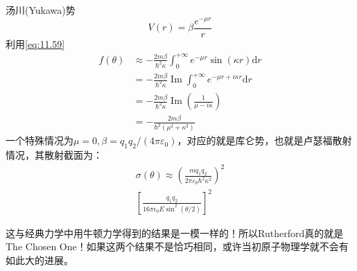\documentclass[a4paper,zihao=-4,linespread=1]{ctexrep}
\begin{document}
	\begin{example}{汤川(Yukawa)势}
		\begin{equation}
			V(r)=\beta\frac{e^{-\mu r}}{r}
		\end{equation}
	利用\ref{eq:11.59}
	\begin{equation}
		\begin{aligned}
		f(\theta)&\approx -\frac{2m\beta}{\hbar^2\kappa}\int_0^{+\infty}e^{-\mu r}\sin(\kappa r)\mathrm{d}r\\
		&=-\frac{2m\beta}{\hbar^2\kappa}\operatorname{Im}\int_0^{+\infty}e^{-\mu r+i\kappa r}\mathrm{d}r\\
		&=-\frac{2m\beta}{\hbar^2\kappa}\operatorname{Im}\left(\frac{1}{\mu-i\kappa}\right)\\
		&=-\frac{2m\beta}{\hbar^2(\mu^2+\kappa^2)}
	\end{aligned}
	\end{equation}
	一个特殊情况为$\mu=0,\beta=q_1q_2/(4\pi\varepsilon_0)$，对应的就是库仑势，也就是卢瑟福散射情况，其散射截面为：
	\begin{equation}
		\begin{aligned}
			\sigma(\theta)\approx \left(\frac{mq_1q_2}{2\pi\varepsilon_0\hbar^2\kappa^2}\right)^2\\
			\left[\frac{q_{1} q_{2}}{16 \pi \epsilon_{0} E \sin ^{2}(\theta / 2)}\right]^{2}
		\end{aligned}
	\end{equation}
	
	\setlength\parindent{2em}这与经典力学中用牛顿力学得到的结果是一模一样的！所以Rutherford真的就是The Chosen One！如果这两个结果不是恰巧相同，或许当初原子物理学就不会有如此大的进展。
	\end{example}
	
\end{document}
